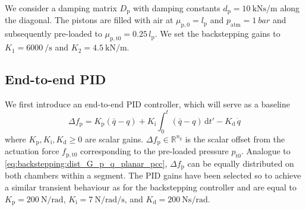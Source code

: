 We consider a damping matrix $D_\mathrm{p}$ with damping constants $d_\mathrm{p} = \SI{10}{\kilo \newton \second \per \meter}$ along the diagonal. The pistons are filled with air at $\mu_{\mathrm{p}, 0} = l_\mathrm{p}$ and $p_\mathrm{atm} = \SI{1}{bar}$ and subsequently pre-loaded to $\mu_{\mathrm{p}, \mathrm{t}0} = 0.25 \, l_\mathrm{p}$. %
We set the backstepping gains to $K_1 = \SI{6000}{\per \second}$ and $K_2 = \SI{4.5}{\kilo \newton \per \meter}$.

\subsection{End-to-end PID}
We first introduce an end-to-end PID controller, which will serve as a baseline
%
\begin{equation}
    \Delta f_\mathrm{p} = K_\mathrm{p} (\bar{q}-q) + K_\mathrm{i} \int_0^t (\bar{q}-q) \, \mathrm{d}t' - K_\mathrm{d} \, \dot{q}
\end{equation}
%
where $K_\mathrm{p},K_\mathrm{i},K_\mathrm{d} \geq 0$ are scalar gains. $\Delta f_\mathrm{p} \in \mathbb{R}^{n_q}$ is the scalar offset from the actuation force $f_{\mathrm{p},\mathrm{t}0}$ corresponding to the pre-loaded pressure $p_{\mathrm{t}0}$.
%
Analogue to \eqref{eq:backstepping:dist_G_p_q_planar_pcc}, $\Delta f_\mathrm{p}$ can be equally distributed on both chambers within a segment.
The PID gains have been selected so to achieve a similar transient behaviour as for the backstepping controller %
and are equal to $K_\mathrm{p} = \SI{200}{\newton \per \radian}$, $K_\mathrm{i} = \SI{7}{\newton \per \radian \per \second}$, and $K_\mathrm{d} = \SI{200}{\newton \second \per \radian}$. 

